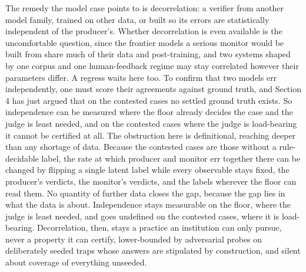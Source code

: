 \documentclass[11pt]{article}
\begin{document}
The remedy the model case points to is decorrelation: a verifier from another model family, trained on other data, or built so its errors are statistically independent of the producer's. Whether decorrelation is even available is the uncomfortable question, since the frontier models a serious monitor would be built from share much of their data and post-training, and two systems shaped by one corpus and one human-feedback regime may stay correlated however their parameters differ. A regress waits here too. To confirm that two models err independently, one must score their agreements against ground truth, and Section 4 has just argued that on the contested cases no settled ground truth exists. So independence can be measured where the floor already decides the case and the judge is least needed, and on the contested cases where the judge is load-bearing it cannot be certified at all. The obstruction here is definitional, reaching deeper than any shortage of data. Because the contested cases are those without a rule-decidable label, the rate at which producer and monitor err together there can be changed by flipping a single latent label while every observable stays fixed, the producer's verdicts, the monitor's verdicts, and the labels wherever the floor can read them. No quantity of further data closes the gap, because the gap lies in what the data is about. Independence stays measurable on the floor, where the judge is least needed, and goes undefined on the contested cases, where it is load-bearing. Decorrelation, then, stays a practice an institution can only pursue, never a property it can certify, lower-bounded by adversarial probes on deliberately seeded traps whose answers are stipulated by construction, and silent about coverage of everything unseeded.
\end{document}
